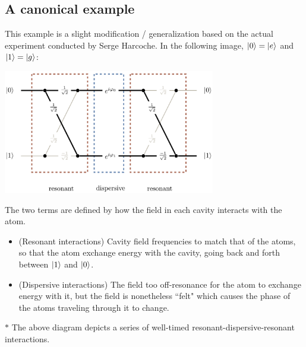 \documentclass[12pt]{article}
\begin{document}
\subsection{A canonical example}
This example is a slight modification / generalization based on the actual experiment conducted by Serge Harcoche. In the following image, $\Ket{0} = \Ket{e}$ and $\Ket{1} = \Ket{g}$:
\begin{center}
\includegraphics[width = 25em]{images/3.jpg}
\end{center}

\begin{definition}
The two terms are defined by how the field in each cavity interacts with the atom.
\begin{itemize}
    \item (Resonant interactions) Cavity field frequencies to match that of the atoms, so that the atom exchange energy with the cavity, going back and forth between $\Ket{1}$ and $\Ket{0}$.
    \item (Dispersive interactions) The field too off-resonance for the atom to exchange energy with it, but the field is nonetheless ``felt" which causes the phase of the atoms traveling through it to change.
\end{itemize}

$*$ The above diagram depicts a series of well-timed resonant-dispersive-resonant interactions.
\end{definition}
\end{document}
